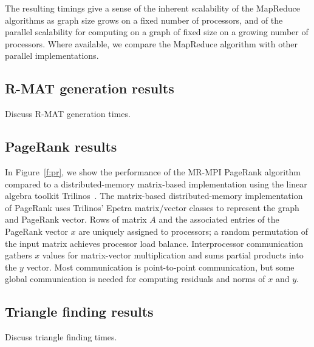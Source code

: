 The resulting timings give a sense of the inherent scalability of the
MapReduce algorithms as graph size grows on a fixed number of
processors, and of the parallel scalability for computing on a graph
of fixed size on a growing number of processors.  Where available, we
compare the MapReduce algorithm with other parallel implementations.

\subsection{R-MAT generation results}
Discuss R-MAT generation times.

\subsection{PageRank results}

In Figure~\ref{f:pr}, we show the performance of the MR-MPI PageRank algorithm
compared to a
distributed-memory matrix-based implementation using the linear
algebra toolkit Trilinos~\cite{Trilinos-Overview}.
The matrix-based distributed-memory implementation of PageRank
uses Trilinos' Epetra matrix/vector classes to represent the graph and
PageRank vector.
Rows of matrix $A$ and the associated entries of the PageRank vector $x$
are uniquely assigned to processors; a random permutation of the input
matrix achieves processor load balance.
Interprocessor communication gathers $x$ values for matrix-vector
multiplication and sums partial products into the $y$ vector.
Most communication is point-to-point communication,
but some global communication is needed for computing
residuals and norms of $x$ and $y$.





\subsection{Triangle finding results}
Discuss triangle finding times.


